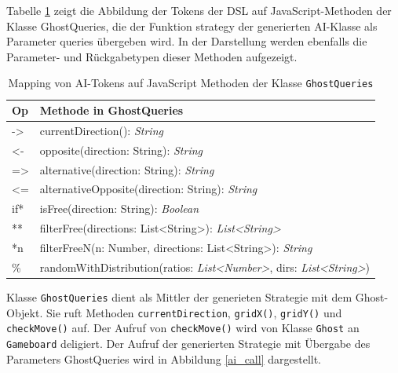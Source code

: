 \documentclass[conference]{IEEEtran}
\begin{document}
Tabelle \ref{token_method_mapping} zeigt die Abbildung der Tokens der DSL auf JavaScript-Methoden der Klasse GhostQueries, die der Funktion strategy der generierten AI-Klasse als Parameter queries übergeben wird. In der Darstellung werden ebenfalls die Parameter- und Rückgabetypen dieser Methoden aufgezeigt.



\begin{table}[!htb]
\caption{Mapping von AI-Tokens auf JavaScript Methoden der Klasse \texttt{GhostQueries}}
\label{token_method_mapping}
\centering
\setlength\tabcolsep{1.5pt}
\begin{tabular}{|l||l|}

\hline
\textbf{Op} & \textbf{Methode in GhostQueries}\\

\hline
-> & currentDirection(): \emph{String} \\

\hline
<- & opposite(direction: String): \emph{String} \\

\hline
=> & alternative(direction: String): \emph{String} \\

\hline
<= & alternativeOpposite(direction: String): \emph{String} \\

\hline
if* & isFree(direction: String): \emph{Boolean} \\

\hline
** & filterFree(directions: List<String>): \emph{List<String>} \\

\hline
*n & filterFreeN(n: Number, directions: List<String>): \emph{String} \\

\hline
\% & randomWithDistribution(ratios: \emph{List<Number>}, dirs: \emph{List<String>})\\

\hline
\end{tabular}
\end{table}

Klasse \texttt{GhostQueries} dient als Mittler der generieten Strategie mit dem Ghost-Objekt. Sie ruft Methoden \texttt{currentDirection}, \texttt{gridX()}, \texttt{gridY()} und \texttt{checkMove()} auf. Der Aufruf von \texttt{checkMove()} wird von Klasse \texttt{Ghost} an \texttt{Gameboard} deligiert.
Der Aufruf der generierten Strategie mit Übergabe des Parameters GhostQueries wird in Abbildung \ref{ai_call} dargestellt.
\end{document}
